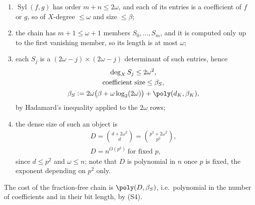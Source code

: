 \begin{enumerate}[label=(\alph*),leftmargin=*]
\item $\operatorname{Syl}(f,g)$ has order $m+n\le2\omega$, and each of its entries is a coefficient of
$f$ or $g$, so of $X$-degree $\le\omega$ and size $\le\beta$;
\item the chain has $m+1\le\omega+1$ members $S_0,\dots,S_m$, and it is computed only up to the first
vanishing member, so its length is at most $\omega$;
\item each $S_j$ is a $(2\omega-j)\times(2\omega-j)$ determinant of such entries, hence
\begin{equation}\label{appBC:eq:sizesout}
\begin{gathered}
\deg_X S_j\le2\omega^{2},\\
\text{coefficient size}\le\beta_S,\\
\beta_S:=2\omega\bigl(\beta+\omega\log_2(2\omega)\bigr)+\poly(d_K,\beta_K),
\end{gathered}
\end{equation}
by Hadamard's inequality applied to the $2\omega$ rows;
\item the dense size of such an object is
\begin{equation}\label{appBC:eq:dense}
\begin{gathered}
D=\binom{d+2\omega^{2}}{d}=\binom{p^{2}+2\omega^{2}}{p^{2}},\\
D=n^{O(p^{2})}\ \text{for fixed } p,
\end{gathered}
\end{equation}
since $d\le p^{2}$ and $\omega\le n$; note that $D$ is polynomial in $n$ once $p$ is fixed, the
exponent depending on $p^{2}$ only.
\end{enumerate}
The cost of the fraction-free chain is $\poly(D,\beta_S)$, i.e.\ polynomial in the number of
coefficients and in their bit length, by (S4).

